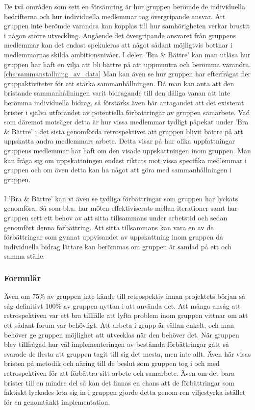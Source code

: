 De två områden som sett en försämring är hur gruppen berömde de individuella bedrifterna och hur individuella medlemmar tog övergripande ansvar. Att gruppen inte berömde varandra kan kopplas till hur samhörigheten verkar brustit i någon större utveckling. Angående det övergripande ansvaret från gruppens medlemmar kan det endast spekuleras att något sådant möjligtvis bottnar i medlemmarnas skilda ambitionsnivåer. I delen 'Bra \& Bättre' kan man utläsa hur gruppen har haft en vilja att bli bättre på att uppmuntra och berömma varandra.\ref{cha:sammanstallning_av_data} Man kan även se hur gruppen har efterfrågat fler gruppaktiviteter för att stärka sammanhållningen. Då man kan anta att den bristande sammanhållningen varit bidragande till den dåliga vanan att inte berömma individuella bidrag, så förstärks även här antagandet att det existerat brister i själva utförandet av potentiella förbättringar av gruppen samarbete. Vad som däremot motsäger detta är hur vissa medlemmar tydligt påpekat under 'Bra \& Bättre' i det sista genomförda retrospektivet att gruppen blivit bättre på att uppskatta andra medlemmars arbete. Detta visar på hur olika uppfattningar gruppens medlemmar har haft om den visade uppskattningen inom gruppen. Man kan fråga sig om uppskattningen endast riktats mot vissa specifika medlemmar i gruppen och om även detta kan ha något att göra med sammanhållningen i gruppen. \\\\
I 'Bra \& Bättre' kan vi även se tydliga förbättringar som gruppen har lyckats genomföra. Så som bl.a. hur möten effektiviserats mellan iterationer samt hur gruppen sett ett behov av att sitta tillsammans under arbetstid och sedan genomfört denna förbättring. Att sitta tillsammans kan vara en av de förbättringar som gynnat uppvisandet av uppskattning inom gruppen då individuella bidrag lättare kan berömmas om gruppen är samlad på ett och samma ställe.


\subsubsection{Formulär}
\label{sec:johan_n-discussion-results-form}
Även om 75\% av gruppen inte kände till retrospektiv innan projektets början så såg definitivt 100\% av gruppen nyttan i att använda det. Att många ansåg att retrospektiven var ett bra tillfälle att lyfta problem inom gruppen vittnar om att ett sådant forum var behövligt. Att arbeta i grupp är sällan enkelt, och man behöver ge gruppen möjlighet att utvecklas när den behöver det. När gruppen blev tillfrågad hur väl implementeringen av bestämda förbättringar gått så svarade de flesta att gruppen tagit till sig det mesta, men inte allt. Även här visas bristen på metodik och näring till de beslut som gruppen tog i och med retrospektiven för att förbättra sitt arbete och samarbete. Även om det bara brister till en mindre del så kan det finnas en chans att de förbättringar som faktiskt lyckades leta sig in i gruppen gjorde detta genom ren viljestyrka istället för en genomtänkt implementation. 

